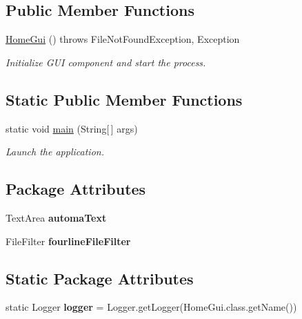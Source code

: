 \subsection*{Public Member Functions}
\begin{DoxyCompactItemize}
\item 
\hyperlink{class_home_gui_add92e1cf71983b9cc6f70f040d3ea593}{Home\-Gui} ()  throws File\-Not\-Found\-Exception, Exception 
\begin{DoxyCompactList}\small\item\em Initialize G\-U\-I component and start the process. \end{DoxyCompactList}\end{DoxyCompactItemize}
\subsection*{Static Public Member Functions}
\begin{DoxyCompactItemize}
\item 
\hypertarget{class_home_gui_a241867731938068ae82ae7d5e7371fa3}{static void \hyperlink{class_home_gui_a241867731938068ae82ae7d5e7371fa3}{main} (String\mbox{[}$\,$\mbox{]} args)}\label{class_home_gui_a241867731938068ae82ae7d5e7371fa3}

\begin{DoxyCompactList}\small\item\em Launch the application. \end{DoxyCompactList}\end{DoxyCompactItemize}
\subsection*{Package Attributes}
\begin{DoxyCompactItemize}
\item 
\hypertarget{class_home_gui_a6b00edbcb893105ddc5e3b2beb4c2dca}{Text\-Area {\bfseries automa\-Text}}\label{class_home_gui_a6b00edbcb893105ddc5e3b2beb4c2dca}

\item 
\hypertarget{class_home_gui_a7f56e390a2982689b92cee117f50e987}{File\-Filter {\bfseries fourline\-File\-Filter}}\label{class_home_gui_a7f56e390a2982689b92cee117f50e987}

\end{DoxyCompactItemize}
\subsection*{Static Package Attributes}
\begin{DoxyCompactItemize}
\item 
\hypertarget{class_home_gui_a6eef831dc2ff4533740f3395c4b9067a}{static Logger {\bfseries logger} = Logger.\-get\-Logger(Home\-Gui.\-class.\-get\-Name())}\label{class_home_gui_a6eef831dc2ff4533740f3395c4b9067a}

\end{DoxyCompactItemize}
